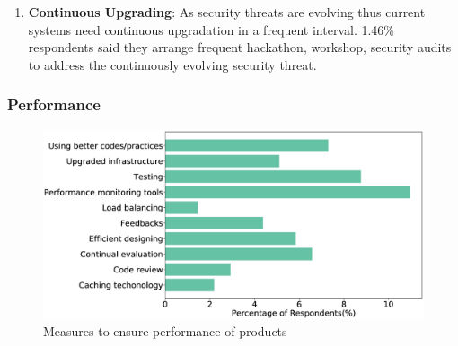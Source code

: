 \begin{enumerate}
    \item \textbf{Continuous Upgrading}: As security threats are evolving thus current systems need continuous upgradation in a frequent interval. 1.46\% respondents said they arrange frequent hackathon, workshop, security audits to address the continuously evolving security threat.
    

   
\end{enumerate}

\subsubsection{Performance}
\label{Performance}
\begin{figure}[htbp]
\includegraphics[scale=0.28]{Figures/Performance.eps} 
\caption{Measures to ensure performance of products}
\label{fig:Measures to ensure security}
\end{figure}
